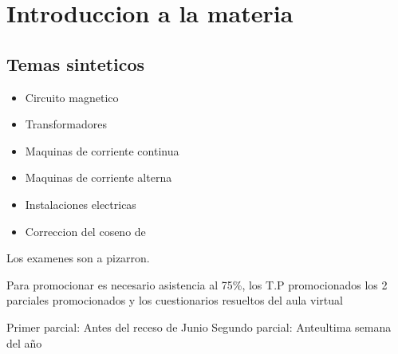 \chapter*{Introduccion a la materia}
\section*{Temas sinteticos}
\begin{itemize}
  \item Circuito magnetico
  \item Transformadores
  \item Maquinas de corriente continua
  \item Maquinas de corriente alterna
  \item Instalaciones electricas
  \item Correccion del coseno de \phi
\end{itemize}

Los examenes son a pizarron.

Para promocionar es necesario asistencia al 75\%, los T.P promocionados
los 2 parciales promocionados y los cuestionarios resueltos del aula virtual

Primer parcial: Antes del receso de Junio
Segundo parcial: Anteultima semana del año
